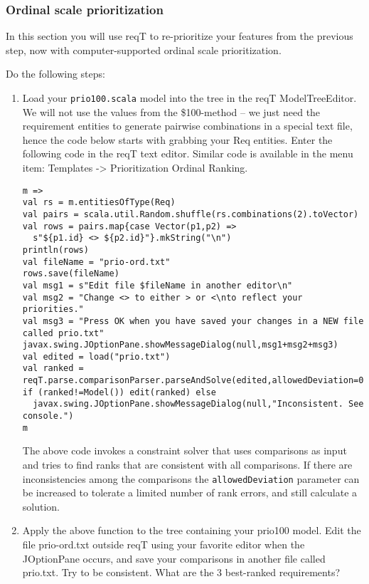 \documentclass[11pt]{article}
\begin{document}
\subsubsection{Ordinal scale prioritization}

In this section you will use reqT to re-prioritize your features from the previous step, now with computer-supported ordinal scale prioritization. 
\begin{framed}
\noindent Do the following steps: 

\begin{enumerate}
\item Load your \verb+prio100.scala+ model into the tree in the reqT ModelTreeEditor. We will not use the values from the \$100-method -- we just need the requirement entities to generate pairwise combinations in a special text file, hence the code below starts with grabbing your Req entities. Enter the following code in the reqT text editor. Similar code is available in the menu item:  Templates -> Prioritization Ordinal Ranking.
\begin{lstlisting}
m => 
val rs = m.entitiesOfType(Req)
val pairs = scala.util.Random.shuffle(rs.combinations(2).toVector)
val rows = pairs.map{case Vector(p1,p2) => 
  s"${p1.id} <> ${p2.id}"}.mkString("\n")
println(rows)
val fileName = "prio-ord.txt"
rows.save(fileName)
val msg1 = s"Edit file $fileName in another editor\n"
val msg2 = "Change <> to either > or <\nto reflect your priorities."
val msg3 = "Press OK when you have saved your changes in a NEW file called prio.txt"
javax.swing.JOptionPane.showMessageDialog(null,msg1+msg2+msg3)
val edited = load("prio.txt")
val ranked = reqT.parse.comparisonParser.parseAndSolve(edited,allowedDeviation=0)
if (ranked!=Model()) edit(ranked) else 
  javax.swing.JOptionPane.showMessageDialog(null,"Inconsistent. See console.")
m
\end{lstlisting}
The above code invokes a constraint solver that uses comparisons as input and tries to find ranks that are consistent with all comparisons. If there are inconsistencies among the comparisons the  \verb+allowedDeviation+ parameter can be increased to tolerate a limited number of rank errors, and still calculate a solution.
\item Apply the above function to the tree containing your prio100 model. Edit the file prio-ord.txt outside reqT using your favorite editor when the JOptionPane occurs, and save your comparisons in another file called prio.txt. Try to be consistent. What are the 3 best-ranked requirements?
\vspace{1em}

\end{enumerate}
\end{framed}
\end{document}

